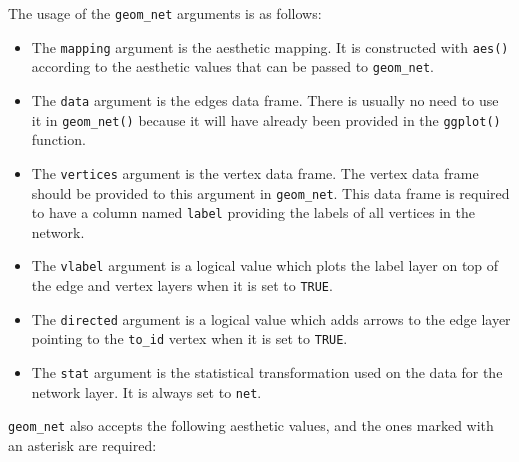 \documentclass[11pt]{article}\usepackage[]{graphicx}\usepackage[]{color}
\begin{document}
  The usage of the \texttt{geom\_net} arguments is as follows:
  \begin{itemize}
  \item The \texttt{mapping} argument is the aesthetic mapping. It is constructed with \texttt{aes()} according to the aesthetic values that can be passed to \texttt{geom\_net}.
  \item The \texttt{data} argument is the edges data frame.  There is usually no need to use it in \texttt{geom\_net()} because it will have already been provided in the \texttt{ggplot()} function.
  \item The \texttt{vertices} argument is the vertex data frame. The vertex data frame should be provided to this argument in \texttt{geom\_net}. This data frame is required to have a column named \texttt{label} providing the labels of all vertices in the network.
  \item The \texttt{vlabel} argument is a logical value which plots the label layer on top of the edge and vertex layers when it is set to \texttt{TRUE}.
  \item The \texttt{directed} argument is a logical value which adds arrows to the edge layer pointing to the \texttt{to\_id} vertex when it is set to \texttt{TRUE}.
  \item The \texttt{stat} argument is the statistical transformation used on the data for the network layer. It is always set to \texttt{net}.
  \end{itemize}
  \texttt{geom\_net} also accepts the following aesthetic values, and the ones marked with an asterisk are required:
\end{document}
